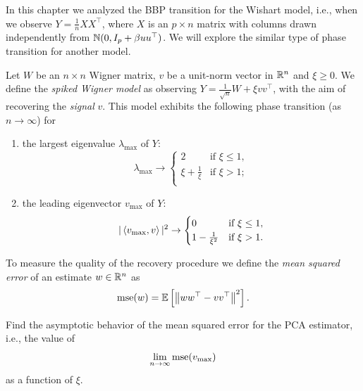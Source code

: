 \begin{myexercise}\label{prob:spiked_wigner}
    In this chapter we analyzed the BBP transition for the Wishart model, i.e., when we observe $Y = \frac{1}{n} XX^\top$, where $X$ is an $p \times n$ matrix with columns drawn independently from $\mathbb{N}(0, I_p + \beta u u^\top)$. We will explore the similar type of phase transition for another model.
    
    Let $W$ be an $n \times n$ Wigner matrix, $v$ be a unit-norm vector in $\mathbb{R}^n$ and $\xi \geq 0$. We define the \textit{spiked Wigner model} as observing $Y = \frac{1}{\sqrt n} W + \xi v v^\top$, with the aim of recovering the \textit{signal} $v$.
    This model exhibits the following phase transition (as $n \to \infty$) for
    \begin{enumerate}
        \item the largest eigenvalue $\lambda_{\max}$ of $Y$:
        \begin{equation*}
            \lambda_{\max} \rightarrow \begin{cases}
                2 &\text{if } \xi \leq 1,\\
                \xi+\frac{1}{\xi} &\text{if } \xi > 1;\\
            \end{cases}
        \end{equation*}
        
        \item the leading eigenvector $v_{\max}$ of $Y$:
        \begin{equation*}
            |\left\langle v_{\max}, v \right\rangle|^2 \rightarrow \begin{cases}
                0 &\text{if } \xi \leq 1,\\
                1-\frac{1}{\xi^2} &\text{if } \xi > 1.\\
            \end{cases}
        \end{equation*}
    \end{enumerate}
    
    To measure the quality of the recovery procedure we define the \textit{mean squared error} of an estimate $w \in \mathbb{R}^n$ as
    \begin{equation*}
        \operatorname{mse}(w) =  \mathbb{E}\left[ {\left\lVert{w w^\top - v v^\top}\right\rVert}^2 \right].
    \end{equation*}
    
    Find the asymptotic behavior of the mean squared error for the PCA estimator, i.e., the value of
    \begin{equation*}
        \lim_{n\to \infty} \operatorname{mse}(v_{\max})
    \end{equation*}
    as a function of $\xi$. 
\end{myexercise}
